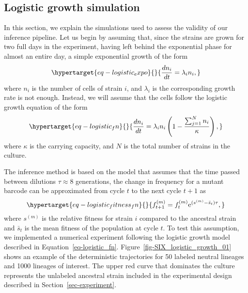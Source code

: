 \documentclass[
  letterpaper,
  DIV=11,
  numbers=noendperiod]{scrartcl}
\begin{document}
\begin{refsegment}
\hypertarget{sec-logistic}{%
\subsection{Logistic growth simulation}\label{sec-logistic}}

In this section, we explain the simulations used to assess the validity
of our inference pipeline. Let us begin by assuming that, since the
strains are grown for two full days in the experiment, having left
behind the exponential phase for almost an entire day, a simple
exponential growth of the form
\begin{equation}\protect\hypertarget{eq-logistic_expo}{}{
\frac{dn_i}{dt} = \lambda_i n_i,
}\label{eq-logistic_expo}\end{equation} where \(n_i\) is the number of
cells of strain \(i\), and \(\lambda_i\) is the corresponding growth
rate is not enough. Instead, we will assume that the cells follow the
logistic growth equation of the form
\begin{equation}\protect\hypertarget{eq-logistic_fn}{}{
\frac{dn_i}{dt} = \lambda_i n_i 
\left( 1 - \frac{\sum_{j=1}^{N}n_i}{\kappa}\right),
}\label{eq-logistic_fn}\end{equation} where \(\kappa\) is the carrying
capacity, and \(N\) is the total number of strains in the culture.

The inference method is based on the model that assumes that the time
passed between dilutions \(\tau \approx 8\) generations, the change in
frequency for a mutant barcode can be approximated from cycle \(t\) to
the next cycle \(t + 1\) as
\begin{equation}\protect\hypertarget{eq-logistic_fitness_fn}{}{
f_{t+1}^{(m)} = f_t^{(m)} \mathrm{e}^{(s^{(m)} - \bar{s}_t)\tau},
}\label{eq-logistic_fitness_fn}\end{equation} where \(s^{(m)}\) is the
relative fitness for strain \(i\) compared to the ancestral strain and
\(\bar{s}_t\) is the mean fitness of the population at cycle \(t\). To
test this assumption, we implemented a numerical experiment following
the logistic growth model described in Equation~\ref{eq-logistic_fn}.
Figure~\ref{fig-SIX_logistic_growth_01} shows an example of the
deterministic trajectories for 50 labeled neutral lineages and 1000
lineages of interest. The upper red curve that dominates the culture
represents the unlabeled ancestral strain included in the experimental
design described in Section~\ref{sec-experiment}.

\begin{figure}


\end{figure}
\end{refsegment}
\end{document}
